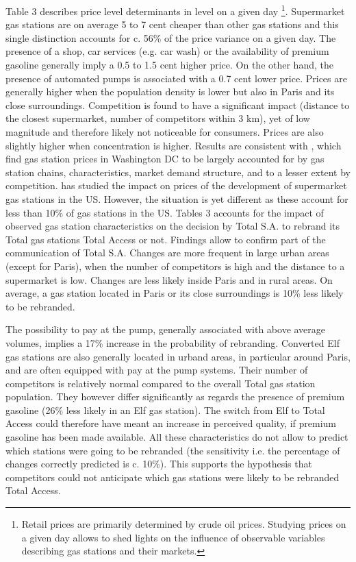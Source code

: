 \documentclass[english]{article}
\begin{document}
Table 3 describes price level determinants in level on a given day%
\footnote{Retail prices are primarily determined by crude oil prices. Studying prices on a given day allows to shed lights on the influence of observable variables describing gas stations and their markets.%
}. Supermarket gas stations are on average 5 to 7 cent cheaper than other gas stations and this single distinction accounts for c. 56\% of the price variance on a given day. The presence of a shop, car services (e.g. car wash) or the availability of premium gasoline generally imply a 0.5 to 1.5 cent higher price. On the other hand, the presence of
automated pumps is associated with a 0.7 cent lower price. Prices are generally higher when the population density is lower but also in Paris and its close surroundings. Competition is found to have a significant impact (distance to the closest supermarket, number of competitors within 3 km), yet of low magnitude and therefore likely not noticeable for consumers. Prices are also slightly higher when concentration is higher. Results are consistent with \cite{HOS08},
which find gas station prices in Washington DC to be largely accounted for by gas station chains, characteristics, market demand structure, and to a lesser extent by competition. \cite{ZIM12} has studied the impact on prices of the development of supermarket gas stations in the US. However, the situation is yet different as these account for less than 10\% of gas stations in the US. Tables 3 accounts for the impact of observed gas station characteristics on the decision by Total S.A. to rebrand its Total gas stations Total Access or not. Findings allow to confirm part of the communication of Total S.A. Changes are more frequent in large urban areas (except for Paris), when the number of competitors is high and the distance to a supermarket is low. Changes are less likely inside Paris and in rural areas. On average, a gas station located in Paris or its close surroundings is 10\% less likely to be rebranded.

The possibility to pay at the pump, generally associated with above average volumes, implies a 17\% increase in the probability of rebranding. Converted Elf gas stations are also generally located in urband areas, in particular around Paris, and are often equipped with pay at the pump systems. Their number of competitors is relatively normal compared to the overall Total gas station population. They however differ significantly as regards the presence of premium gasoline (26\% less likely in an Elf gas station). The switch from Elf to Total Access could therefore have meant an increase in perceived quality, if premium gasoline has been made available. All these characteristics do not allow to predict which stations were going to be rebranded (the sensitivity i.e. the percentage of changes correctly predicted is c. 10\%). This supports the hypothesis that competitors could not anticipate which gas stations were likely to be rebranded Total Access. \medskip{}
\end{document}
